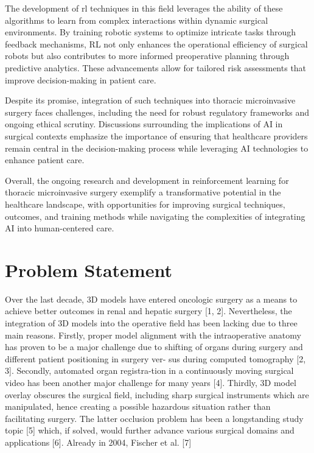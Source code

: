 The development of \gls{rl} techniques in this field leverages the ability of these algorithms to learn 
from complex interactions within dynamic surgical environments. By training robotic systems to 
optimize intricate tasks through feedback mechanisms, RL not only enhances the operational efficiency 
of surgical robots but also contributes to more informed preoperative planning through predictive 
analytics. 
These advancements allow for tailored risk assessments that improve decision-making in patient care.


Despite its promise, integration of such techniques into thoracic microinvasive surgery faces
challenges, including the need for robust regulatory frameworks and ongoing ethical scrutiny. 
Discussions surrounding the implications of AI in surgical contexts emphasize the importance of 
ensuring that healthcare providers remain central in the decision-making process while leveraging AI 
technologies to enhance patient care.

Overall, the ongoing research and development in reinforcement learning for thoracic microinvasive 
surgery exemplify a transformative potential in the healthcare landscape, with opportunities for 
improving surgical techniques, outcomes, and training methods while navigating the complexities 
of integrating AI into human-centered care.

\section{Problem Statement}
Over the last decade, 3D models have entered oncologic surgery
as a means to achieve better outcomes in renal and hepatic
surgery [1, 2]. Nevertheless, the integration of 3D models into
the operative field has been lacking due to three main reasons.
Firstly, proper model alignment with the intraoperative anatomy
has proven to be a major challenge due to shifting of organs
during surgery and different patient positioning in surgery ver-
sus during computed tomography [2, 3]. Secondly, automated
organ registra-tion in a continuously moving surgical video
has been another major challenge for many years [4]. Thirdly,
3D model overlay obscures the surgical field, including sharp
surgical instruments which are manipulated, hence creating a
possible hazardous situation rather than facilitating surgery. The
latter occlusion problem has been a longstanding study topic
[5] which, if solved, would further advance various surgical
domains and applications [6]. Already in 2004, Fischer et al. [7]

